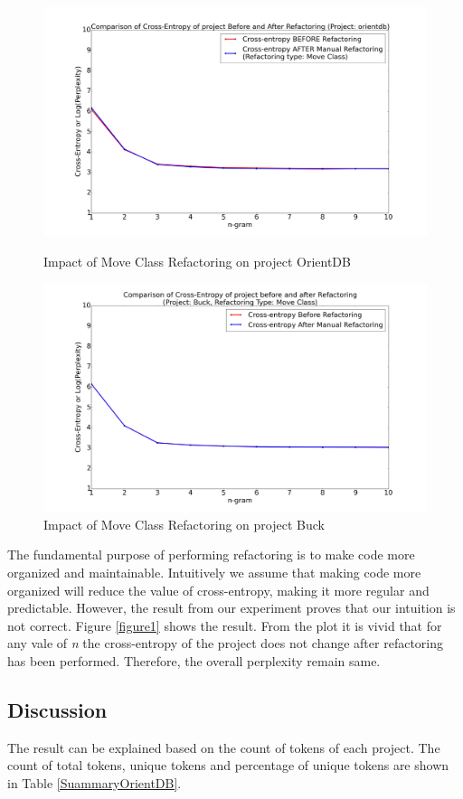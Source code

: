 \documentclass[conference]{IEEEtran}
\begin{document}
\begin{figure}[ht!]
\centering
\includegraphics[width=150mm]{../Result/Refactoring_MoveClass/Plot/OrientDB.png}
\caption{Impact of Move Class Refactoring on project OrientDB}
\label{figure1}
\includegraphics[width=150mm]{../Result/Refactoring_MoveClass/Plot/buck.png}
\caption{Impact of Move Class Refactoring on project Buck}
\label{figure2}
\end{figure}

The fundamental purpose of performing refactoring is to make code more organized and maintainable. Intuitively we assume that making code more organized will reduce the value of cross-entropy, making it more regular and predictable. However, the result from our experiment proves that our intuition is not correct. Figure \ref{figure1} shows the result. From the plot it is vivid that for any vale of \textit{n} the cross-entropy of the project does not change after refactoring has been performed. Therefore, the overall perplexity remain same.

\subsection{Discussion} \label{ManualRefactDiscussion}
The result can be explained based on the count of tokens of each project. The count of total tokens, unique tokens and percentage of unique tokens are shown in Table \ref{SuammaryOrientDB}.
\end{document}
